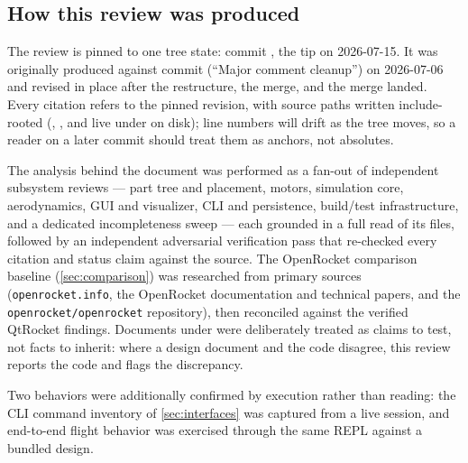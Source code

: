 \subsection{How this review was produced}

The review is pinned to one tree state: commit , the  tip
on 2026-07-15. It was originally produced against commit  (``Major comment
cleanup'') on 2026-07-06 and revised in place after the  restructure, the
 merge, and the  merge landed. Every
 citation refers to the pinned revision, with source paths written
include-rooted (, , and  live under  on
disk); line numbers will drift as the tree moves, so a reader on a later commit should
treat them as anchors, not absolutes.

The analysis behind the document was performed as a fan-out of independent subsystem
reviews --- part tree and placement, motors, simulation core, aerodynamics, GUI and
visualizer, CLI and persistence, build/test infrastructure, and a dedicated
incompleteness sweep --- each grounded in a full read of its files, followed by an
independent adversarial verification pass that re-checked every citation and status claim
against the source. The OpenRocket comparison baseline (\cref{sec:comparison}) was
researched from primary sources (\texttt{openrocket.info}, the OpenRocket documentation
and technical papers, and the \texttt{openrocket/openrocket} repository), then reconciled
against the verified QtRocket findings. Documents under  were deliberately
treated as claims to test, not facts to inherit: where a design document and the code
disagree, this review reports the code and flags the discrepancy.

Two behaviors were additionally confirmed by execution rather than reading: the CLI
command inventory of \cref{sec:interfaces} was captured from a live
 session, and end-to-end flight behavior was exercised through
the same REPL against a bundled design.
